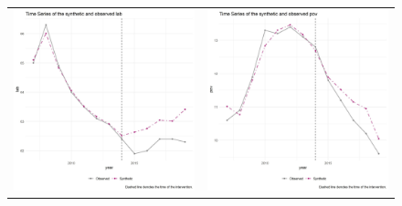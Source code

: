 \documentclass{article}
\begin{document}
\begin{figure}
\begin{center}
\begin{tabular}{cc}
 \includegraphics[width=80mm]{nc_lab_trend} &   \includegraphics[width=80mm]{nc_pov_trend} \\
\end{tabular}
\end{center}
\end{figure}

\restoregeometry

\end{document}
